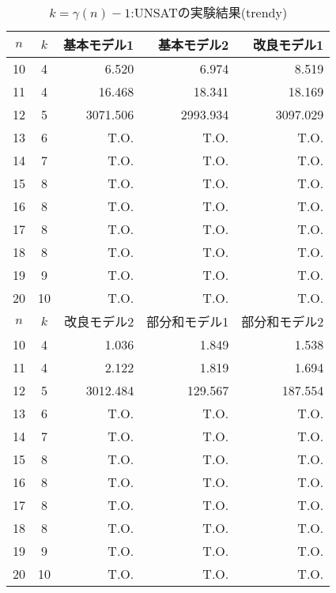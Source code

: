 \begin{table}[ht]
 \caption{$k=\gamma(n)-1$:UNSATの実験結果(trendy)}
 \label{tb:exUNSAT}
 \centering
 \begin{tabular}{|c|c|r|r|r|} \hline
  $n$ & $k$ & 基本モデル1 & 基本モデル2 & 改良モデル1 \\ \hline
  10 & 4 & 6.520 & 6.974 & 8.519 \\
  11 & 4 & 16.468 & 18.341 & 18.169 \\
  12 & 5 & 3071.506 & 2993.934 & 3097.029 \\
  13 & 6 & T.O. & T.O. & T.O. \\  
  14 & 7 & T.O. & T.O. & T.O. \\ 
  15 & 8 & T.O. & T.O. & T.O. \\  
  16 & 8 & T.O. & T.O. & T.O. \\  
  17 & 8 & T.O. & T.O. & T.O. \\  
  18 & 8 & T.O. & T.O. & T.O. \\  
  19 & 9 & T.O. & T.O. & T.O. \\  
  20 & 10 & T.O. & T.O. & T.O. \\ \hline \hline
  $n$ & $k$ & 改良モデル2 & 部分和モデル1 & 部分和モデル2 \\ \hline
  10 & 4 & 1.036 & 1.849 & 1.538 \\
  11 & 4 & 2.122 & 1.819 & 1.694 \\
  12 & 5 & 3012.484 & 129.567 & 187.554 \\
  13 & 6 & T.O. & T.O. & T.O. \\  
  14 & 7 & T.O. & T.O. & T.O. \\ 
  15 & 8 & T.O. & T.O. & T.O. \\  
  16 & 8 & T.O. & T.O. & T.O. \\  
  17 & 8 & T.O. & T.O. & T.O. \\  
  18 & 8 & T.O. & T.O. & T.O. \\  
  19 & 9 & T.O. & T.O. & T.O. \\  
  20 & 10 & T.O. & T.O. & T.O. \\ \hline
 \end{tabular}
\end{table}

